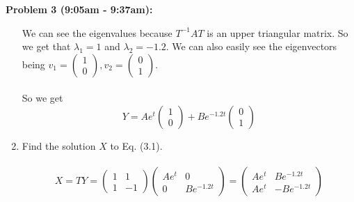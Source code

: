 \documentclass[11pt]{article}
\newenvironment{problem}[1]{\textbf{Problem #1: }}{\newpage}
\begin{document}
\begin{problem}{3 (9:05am - 9:37am)}
\begin{enumerate}[label = (\alph*)]
			We can see the eigenvalues because $T^{-1}AT$ is an upper triangular matrix. So we get that $\lambda_1 = 1$ and $\lambda_2 = -1.2$.  We can also easily see the eigenvectors being $v_1 = \begin{pmatrix}
				1 \\ 0
			\end{pmatrix}, v_2 = \begin{pmatrix}
				0 \\ 1
			\end{pmatrix}$.
			\\ \\
			So we get 
			\[Y = Ae^{t}\begin{pmatrix}
				1 \\ 0
			\end{pmatrix} + Be^{-1.2t}\begin{pmatrix}
				0 \\ 1
			\end{pmatrix}\]
			\item Find the solution $X$ to Eq. (3.1).
			\\ \\
			\[X = TY = \begin{pmatrix}
				1 & 1 \\
				1 & -1
			\end{pmatrix}\begin{pmatrix}
				Ae^{t} & 0 \\
				0 & Be^{-1.2t}
			\end{pmatrix} = \begin{pmatrix}
				Ae^t & Be^{-1.2t} \\
				Ae^{t} & -Be^{-1.2t}
			\end{pmatrix}\]
		\end{enumerate}

\end{problem}
\end{document}
